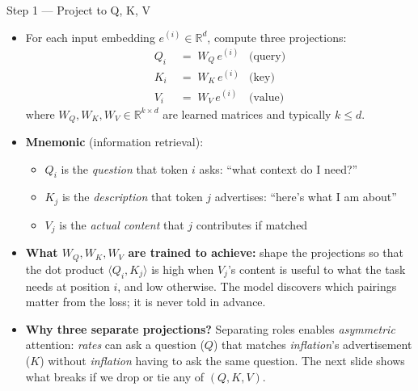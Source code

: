 \begin{frame}{Step 1 --- Project to Q, K, V}
\begin{itemize}
\item For each input embedding $e^{(i)} \in \mathbb{R}^{d}$, compute three projections:
\begin{align*}
   Q_{i} &\;=\; W_{Q}\, e^{(i)} & \text{(query)}\\
   K_{i} &\;=\; W_{K}\, e^{(i)} & \text{(key)}\\
   V_{i} &\;=\; W_{V}\, e^{(i)} & \text{(value)}
\end{align*}
where $W_{Q}, W_{K}, W_{V} \in \mathbb{R}^{k \times d}$ are learned matrices and typically $k \le d$.

\medskip
\item \textbf{Mnemonic} (information retrieval):
\begin{itemize}
    \item $Q_i$ is the \emph{question} that token $i$ asks: ``what context do I need?''
    \item $K_j$ is the \emph{description} that token $j$ advertises: ``here's what I am about''
    \item $V_j$ is the \emph{actual content} that $j$ contributes if matched
\end{itemize}

\medskip
\item \textbf{What $W_{Q}, W_{K}, W_{V}$ are trained to achieve:} shape the projections so that the dot product $\langle Q_{i}, K_{j}\rangle$ is high when $V_{j}$'s content is useful to what the task needs at position $i$, and low otherwise. The model discovers which pairings matter from the loss; it is never told in advance.

\medskip
\item \textbf{Why three separate projections?} Separating roles enables \emph{asymmetric} attention: \textit{rates} can ask a question ($Q$) that matches \textit{inflation}'s advertisement ($K$) without \textit{inflation} having to ask the same question. The next slide shows what breaks if we drop or tie any of $(Q, K, V)$.
\end{itemize}
\end{frame}

